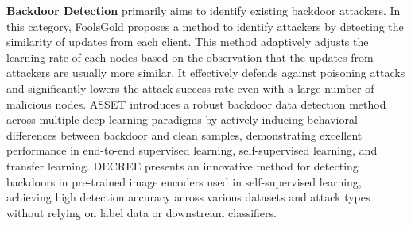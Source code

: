 \documentclass[lettersize,journal]{IEEEtran}
\begin{document}
\textbf{Backdoor Detection} primarily aims to identify existing backdoor attackers. In this category, FoolsGold\cite{foolsgold} proposes a method to identify attackers by detecting the similarity of updates from each client. This method adaptively adjusts the learning rate of each nodes based on the observation that the updates from attackers are usually more similar. It effectively defends against poisoning attacks and significantly lowers the attack success rate even with a large number of malicious nodes. ASSET \cite{pan2023asset} introduces a robust backdoor data detection method across multiple deep learning paradigms by actively inducing behavioral differences between backdoor and clean samples, demonstrating excellent performance in end-to-end supervised learning, self-supervised learning, and transfer learning. DECREE \cite{feng2023detecting} presents an innovative method for detecting backdoors in pre-trained image encoders used in self-supervised learning, achieving high detection accuracy across various datasets and attack types without relying on label data or downstream classifiers.
\end{document}
